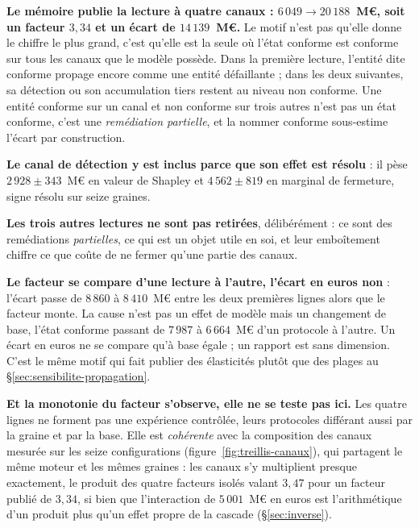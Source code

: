 \begin{cle}
\textbf{Le mémoire publie la lecture à quatre canaux : $6\,049 \to 20\,188$~M\euro, soit un
facteur $3{,}34$ et un écart de $14\,139$~M\euro.} Le motif n'est pas qu'elle donne le chiffre
le plus grand, c'est qu'elle est la seule où l'état conforme est conforme sur tous les
canaux que le modèle possède. Dans la première lecture, l'entité dite conforme propage encore
comme une entité défaillante ; dans les deux suivantes, sa détection ou son accumulation tiers
restent au niveau non conforme. Une entité conforme sur un canal et non conforme sur trois autres
n'est pas un état conforme, c'est une \emph{remédiation partielle}, et la nommer conforme
sous-estime l'écart par construction.

\textbf{Le canal de détection y est inclus parce que son effet est résolu} : il pèse
$2\,928 \pm 343$~M\euro{} en valeur de Shapley et
$4\,562 \pm 819$ en marginal de fermeture, signe résolu sur seize graines.

\textbf{Les trois autres lectures ne sont pas retirées}, délibérément : ce sont des
remédiations \emph{partielles}, ce qui est un objet utile en soi, et leur emboîtement chiffre ce
que coûte de ne fermer qu'une partie des canaux.
\end{cle}

\begin{attention}
\textbf{Le facteur se compare d'une lecture à l'autre, l'écart en euros non} : l'écart passe de $8\,860$ à $8\,410$~M\euro{}
entre les deux premières lignes alors que le facteur monte. La cause n'est pas un effet de modèle
mais un changement de base, l'état conforme passant de $7\,987$ à $6\,664$~M\euro{} d'un
protocole à l'autre. Un écart en euros ne se compare qu'à base égale ; un rapport est sans
dimension. C'est le même motif qui fait publier des élasticités plutôt que des plages au
\S\ref{sec:sensibilite-propagation}.

\textbf{Et la monotonie du facteur s'observe, elle ne se teste pas ici.} Les quatre lignes ne
forment pas une expérience contrôlée, leurs protocoles différant aussi par la graine et par la
base. Elle est \emph{cohérente} avec la composition des canaux mesurée sur les seize
configurations (figure~\ref{fig:treillis-canaux}), qui partagent le même moteur et les mêmes
graines : les canaux s'y multiplient
presque exactement, le produit des quatre facteurs isolés valant $3{,}47$ pour un facteur publié
de $3{,}34$, si bien que l'interaction de $5\,001$~M\euro{} en euros est l'arithmétique d'un
produit plus qu'un effet propre de la cascade (\S\ref{sec:inverse}).
\end{attention}

